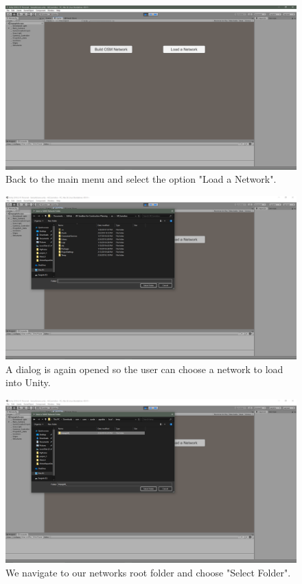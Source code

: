 \documentclass[letterpaper, 10pt, onecolumn, draftclsnofoot]{IEEEtran}
\begin{document}
\vspace{3pt}
\begin{figure}[h!]
    \includegraphics[width=\textwidth]{BackToUnityOsm_9}
    \caption{Back to the main menu and select the option "Load a Network".}
    \label{fig:my_label}
\end{figure}
\vspace{3pt}
\begin{figure}[h!]
    \includegraphics[width=\textwidth]{LoadNetworkSelected_10}
    \caption{A dialog is again opened so the user can choose a network to load into Unity.}
    \label{fig:my_label}
\end{figure}
\vspace{3pt}
\begin{figure}[h!]
    \includegraphics[width=\textwidth]{SelectFolder_11}
    \caption{We navigate to our networks root folder and choose "Select Folder".}
    \label{fig:my_label}
\end{figure}
\end{document}
